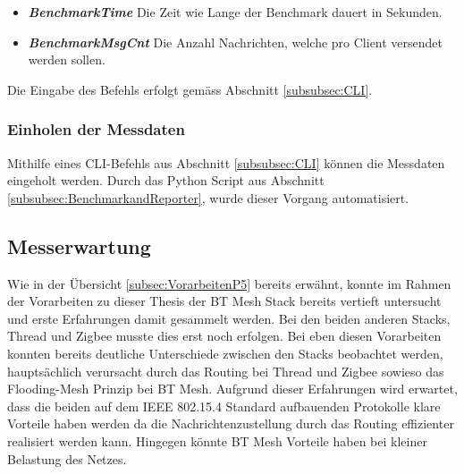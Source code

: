\begin{itemize}
	\item \textit{\textbf{BenchmarkTime}} Die Zeit wie Lange der Benchmark dauert in Sekunden. 
	\item \textit{\textbf{BenchmarkMsgCnt}} Die Anzahl Nachrichten, welche pro Client versendet werden sollen. 
\end{itemize}

Die Eingabe des Befehls erfolgt gemäss Abschnitt \ref{subsubsec:CLI}. 


\subsubsection{Einholen der Messdaten}\label{subsec:GetNodeReports}

Mithilfe eines CLI-Befehls aus Abschnitt \ref{subsubsec:CLI} können die Messdaten eingeholt werden. Durch das Python Script aus Abschnitt \ref{subsubsec:BenchmarkandReporter}, wurde dieser Vorgang automatisiert. 


\subsection{Messerwartung}\label{subsec:Messerwartung}
Wie in der Übersicht \ref{subsec:VorarbeitenP5} bereits erwähnt, konnte im Rahmen der Vorarbeiten zu dieser Thesis der BT Mesh Stack bereits vertieft untersucht und erste Erfahrungen damit gesammelt werden. Bei den beiden anderen Stacks, Thread und Zigbee musste dies erst noch erfolgen.
Bei eben diesen Vorarbeiten konnten bereits deutliche Unterschiede zwischen den Stacks beobachtet werden, hauptsächlich verursacht durch das Routing bei Thread und Zigbee sowieso das Flooding-Mesh Prinzip bei BT Mesh.
Aufgrund dieser Erfahrungen wird erwartet, dass die beiden auf dem IEEE 802.15.4 Standard aufbauenden Protokolle klare Vorteile haben werden da die Nachrichtenzustellung durch das Routing effizienter realisiert werden kann.
Hingegen könnte BT Mesh Vorteile haben bei kleiner Belastung des Netzes.

